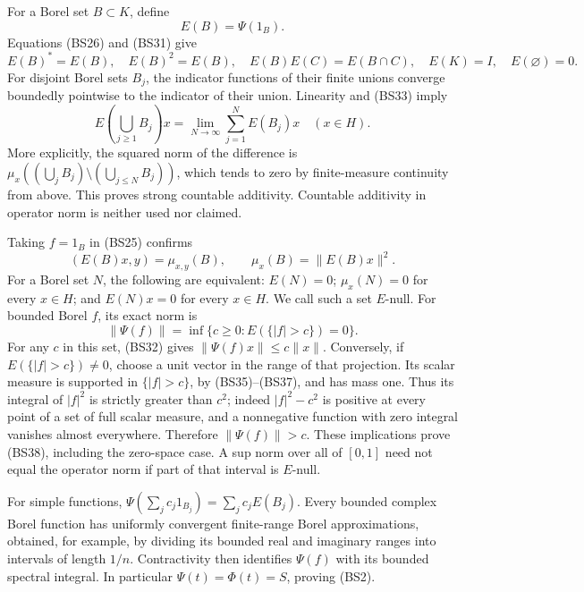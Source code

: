 \documentclass[
  11pt,
]{article}
\begin{document}
For a Borel set \(B\subset K\), define \[
 E(B)=\Psi(1_B).
 \tag{BS34}
\] Equations (BS26) and (BS31) give \[
 E(B)^*=E(B),\quad E(B)^2=E(B),\quad
 E(B)E(C)=E(B\cap C),\quad E(K)=I,\quad E(\varnothing)=0.
 \tag{BS35}
\] For disjoint Borel sets \(B_j\), the indicator functions of their
finite unions converge boundedly pointwise to the indicator of their
union. Linearity and (BS33) imply \[
 E\left(\bigcup_{j\geq1}B_j\right)x
       =\lim_{N\to\infty}\sum_{j=1}^NE(B_j)x
       \quad(x\in H).
 \tag{BS36}
\] More explicitly, the squared norm of the difference is
\(\mu_x((\bigcup_jB_j)\setminus(\bigcup_{j\leq N}B_j))\), which tends to
zero by finite-measure continuity from above. This proves strong
countable additivity. Countable additivity in operator norm is neither
used nor claimed.

Taking \(f=1_B\) in (BS25) confirms \[
 (E(B)x,y)=\mu_{x,y}(B),\qquad
 \mu_x(B)=\|E(B)x\|^2.
 \tag{BS37}
\] For a Borel set \(N\), the following are equivalent: \(E(N)=0\);
\(\mu_x(N)=0\) for every \(x\in H\); and \(E(N)x=0\) for every
\(x\in H\). We call such a set \(E\)-null. For bounded Borel \(f\), its
exact norm is \[
 \|\Psi(f)\|
 =\inf\{c\geq0:E(\{|f|>c\})=0\}.
 \tag{BS38}
\] For any \(c\) in this set, (BS32) gives \(\|\Psi(f)x\|\leq c\|x\|\).
Conversely, if \(E(\{|f|>c\})\ne0\), choose a unit vector in the range
of that projection. Its scalar measure is supported in \(\{|f|>c\}\), by
(BS35)--(BS37), and has mass one. Thus its integral of \(|f|^2\) is
strictly greater than \(c^2\); indeed \(|f|^2-c^2\) is positive at every
point of a set of full scalar measure, and a nonnegative function with
zero integral vanishes almost everywhere. Therefore \(\|\Psi(f)\|>c\).
These implications prove (BS38), including the zero-space case. A sup
norm over all of \([0,1]\) need not equal the operator norm if part of
that interval is \(E\)-null.

For simple functions, \(\Psi(\sum_jc_j1_{B_j})=\sum_jc_jE(B_j)\). Every
bounded complex Borel function has uniformly convergent finite-range
Borel approximations, obtained, for example, by dividing its bounded
real and imaginary ranges into intervals of length \(1/n\).
Contractivity then identifies \(\Psi(f)\) with its bounded spectral
integral. In particular \(\Psi(t)=\Phi(t)=S\), proving (BS2).
\end{document}
